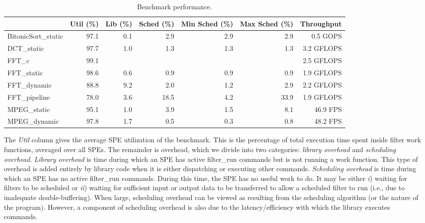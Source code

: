 \begin{table*}[!tb]
\begin{center}
\begin{tabular}{|l|r|r|r|r|r|r|}
\hline
                             & Util (\%) & Lib (\%) & Sched (\%) & Min Sched (\%) & Max Sched (\%) & Throughput \\
\hline
\textsf{BitonicSort\_static} & 97.1 & 0.1 &   2.9 &       2.9 &       2.9 &        0.5 GOPS \\
\hline
\textsf{DCT\_static}         & 97.7 & 1.0 &   1.3 &       1.3 &       1.3 &        3.2 GFLOPS \\
\hline
\textsf{FFT\_c}              & 99.1 &     &       &           &           &        2.5 GFLOPS \\
\textsf{FFT\_static}         & 98.6 & 0.6 &   0.9 &       0.9 &       0.9 &        1.9 GFLOPS \\
\textsf{FFT\_dynamic}        & 88.8 & 9.2 &   2.0 &       1.2 &       2.9 &        2.2 GFLOPS \\
\textsf{FFT\_pipeline}       & 78.0 & 3.6 &  18.5 &       4.2 &      33.9 &        1.9 GFLOPS \\
\hline
\textsf{MPEG\_static}        & 95.1 & 1.0 &   3.9 &       1.5 &       8.1 &       46.9 FPS \\
\textsf{MPEG\_dynamic}       & 97.8 & 1.7 &   0.5 &       0.3 &       0.8 &       48.2 FPS \\
\hline
\end{tabular}
\end{center}
\label{fig:perf:stats}
\caption{Benchmark performance.}
\end{table*}

The \emph{Util} column gives the average SPE utilization of the
benchmark. This is the percentage of total execution time spent inside filter work functions,
averaged over all SPEs. The remainder is overhead, which we divide into two categories:
\emph{library overhead} and \emph{scheduling overhead}. \emph{Library overhead}
is time during which an SPE has active \textsf{filter\_run} commands but is not
running a work function. This type of overhead is added entirely by library code
when it is either dispatching or executing other commands.
\emph{Scheduling overhead} is time during which an SPE has no active
\textsf{filter\_run} commands. During this time, the SPE has no useful work to do.
It may be either \emph{i}) waiting for filters to be scheduled or \emph{ii})
waiting for sufficient input or output data to be transferred to allow a scheduled filter to run
(i.e., due to inadequate double-buffering).
When large, scheduling overhead can be viewed as resulting from the scheduling algorithm
(or the nature of the program). However, a component of scheduling overhead is also
due to the latency/efficiency with which the library executes commands.


